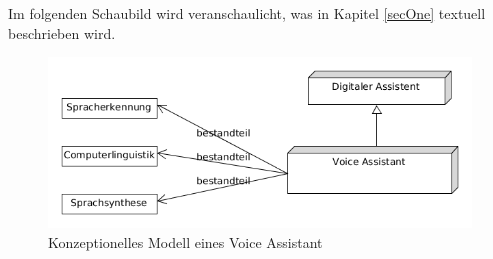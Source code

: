 Im folgenden Schaubild wird veranschaulicht, was in Kapitel \ref{secOne} textuell beschrieben wird.
\begin{figure}[htb]
	\centering
	\includegraphics[scale=0.36]{content/img/bestandteile.png}
	\caption{Konzeptionelles Modell eines Voice Assistant}
	\label{imgBestandteile}
\end{figure}

